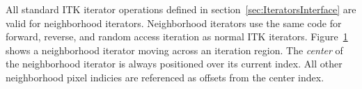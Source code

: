All standard ITK iterator operations defined in
section~\ref{sec:IteratorsInterface} are valid for neighborhood iterators.
Neighborhood iterators use the same code for forward, reverse, and random access
iteration as normal ITK iterators.
Figure~\ref{fig:WalkingNeighborhoodIterator} shows a neighborhood iterator
moving across an iteration region.  The \emph{center} of the
neighborhood iterator is always positioned over its current index. All
other neighborhood pixel indicies are referenced as offsets from the center
index.

\begin{figure}
\centering
\protect\label{fig:WalkingNeighborhoodIterator}
\end{figure}


